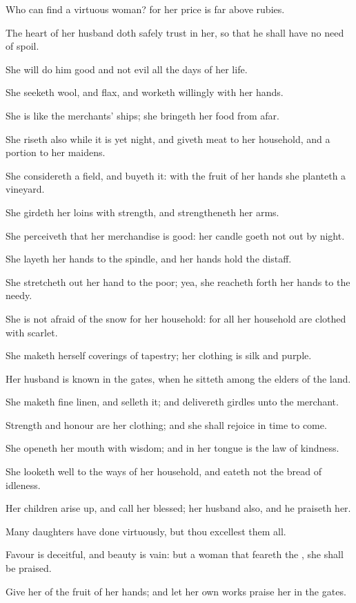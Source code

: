 \verse Who can find a virtuous woman? for her price is far above rubies.

\verse The heart of her husband doth safely trust in her, so that he shall have no need of spoil.

\verse She will do him good and not evil all the days of her life.

\verse She seeketh wool, and flax, and worketh willingly with her hands.

\verse She is like the merchants' ships; she bringeth her food from afar.

\verse She riseth also while it is yet night, and giveth meat to her household, and a portion to her maidens.

\verse She considereth a field, and buyeth it: with the fruit of her hands she planteth a vineyard.

\verse She girdeth her loins with strength, and strengtheneth her arms.

\verse She perceiveth that her merchandise is good: her candle goeth not out by night.

\verse She layeth her hands to the spindle, and her hands hold the distaff.

\verse She stretcheth out her hand to the poor; yea, she reacheth forth her hands to the needy.

\verse She is not afraid of the snow for her household: for all her household are clothed with scarlet.

\verse She maketh herself coverings of tapestry; her clothing is silk and purple.

\verse Her husband is known in the gates, when he sitteth among the elders of the land.

\verse She maketh fine linen, and selleth it; and delivereth girdles unto the merchant.

\verse Strength and honour are her clothing; and she shall rejoice in time to come.

\verse She openeth her mouth with wisdom; and in her tongue is the law of kindness.

\verse She looketh well to the ways of her household, and eateth not the bread of idleness.

\verse Her children arise up, and call her blessed; her husband also, and he praiseth her.

\verse Many daughters have done virtuously, but thou excellest them all.

\verse Favour is deceitful, and beauty is vain: but a woman that feareth the \LORD, she shall be praised.

\verse Give her of the fruit of her hands; and let her own works praise her in the gates.

